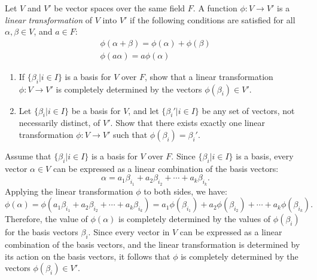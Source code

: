 \begin{problem}[33.24]
  Let $V$ and $V'$ be vector spaces over the same field $F$. A function $\phi : V \to V'$ is a \textit{linear transformation} of $V$ into $V'$ if the following conditions are satisfied for all $\alpha, \beta \in V$, and $a \in F$:
  \begin{gather*}
    \phi(\alpha + \beta) = \phi(\alpha) + \phi(\beta) \\
    \phi(a\alpha) = a\phi(\alpha)
  \end{gather*}
  \begin{enumerate}
    \item If $\{\beta_i | i \in I\}$ is a basis for $V$ over $F$, show that a linear transformation $\phi : V \to V'$ is completely determined by the vectors $\phi(\beta_i) \in V'$.
    \item Let $\{\beta_i | i \in I\}$ be a basis for $V$, and let $\{\beta_i' | i \in I\}$ be any set of vectors, not necessarily distinct, of $V'$. Show that there exists exactly one linear transformation $\phi : V \to V'$ such that $\phi(\beta_i) = \beta_i'$.
  \end{enumerate}
\end{problem}

\begin{solution}[(i)]
  Assume that $\{\beta_i | i \in I\}$ is a basis for $V$ over $F$. Since $\{\beta_i | i \in I\}$ is a basis, every vector $\alpha \in V$ can be expressed as a linear combination of the basis vectors:
  \[%
    \alpha = a_1\beta_{i_1} + a_2\beta_{i_2} + \cdots + a_k\beta_{i_k}
  .\]%
  Applying the linear transformation $\phi$ to both sides, we have:
  \[%
    \phi(\alpha) = \phi(a_1\beta_{i_1} + a_2\beta_{i_2} + \cdots + a_k\beta_{i_k}) = a_1\phi(\beta_{i_1}) + a_2\phi(\beta_{i_2}) + \cdots + a_k\phi(\beta_{i_k})
  .\]%
  Therefore, the value of $\phi(\alpha)$ is completely determined by the values of $\phi(\beta_i)$ for the basis vectors $\beta_i$. Since every vector in $V$ can be expressed as a linear combination of the basis vectors, and the linear transformation is determined by its action on the basis vectors, it follows that $\phi$ is completely determined by the vectors $\phi(\beta_i) \in V'$.
\end{solution}


